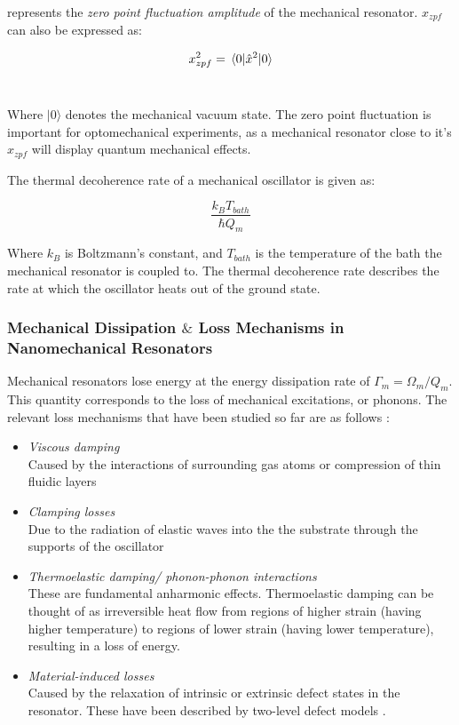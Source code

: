 \documentclass[%
 reprint,
nofootinbib,
 amsmath,amssymb,
 aps,
]{revtex4-2}
\begin{document}
represents the \textit{zero point fluctuation amplitude} of the mechanical resonator. $x_{zpf}$ can also be expressed as:
\

$$ x_{zpf}^2 = \expval{\hat{x}^2}{0} $$     %
\

Where $\mid{0} \big \rangle$ denotes the mechanical vacuum state. The zero point fluctuation is important for optomechanical experiments, as a mechanical resonator close to it's $x_{zpf}$ will display quantum mechanical effects.
\newline

The thermal decoherence rate of a mechanical oscillator is given as:

$$\frac{k_{B}T_{bath}}{\hbar Q_{m}} $$

Where $k_{B}$ is Boltzmann's constant, and $T_{bath}$ is the temperature of the bath the mechanical resonator is coupled to. The thermal decoherence rate describes the rate at which the oscillator heats out of the ground state. 


\subsubsection{Mechanical Dissipation $\&$ Loss Mechanisms in Nanomechanical Resonators}
Mechanical resonators lose energy at the energy dissipation rate of $\Gamma_m = \Omega_m / Q_m$. This quantity corresponds to the loss of mechanical excitations, or phonons. The relevant loss mechanisms that have been studied so far are as follows \cite{cavity_optomechanics_2014}:

\begin{itemize}

    \item \textit{Viscous damping} \\
        Caused by the interactions of surrounding gas atoms or compression of thin fluidic layers
        
    \item \textit{Clamping losses} \\
       Due to the radiation of elastic waves into the the substrate through the supports of the oscillator
        
    \item \textit{Thermoelastic damping/ phonon-phonon interactions} \\
        These are fundamental anharmonic effects. Thermoelastic damping can be thought of as irreversible heat flow from regions of higher strain (having higher temperature) to regions of lower strain (having lower temperature), resulting in a loss of energy.
        
    \item \textit{Material-induced losses} \\
       Caused by the relaxation of intrinsic or extrinsic defect states in the resonator. These have been described by two-level defect models \cite{two_level_damping}.

\end{itemize}
\end{document}
